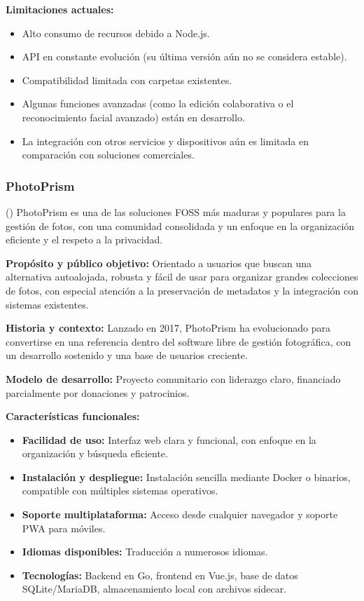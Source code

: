 \textbf{Limitaciones actuales:}
\begin{itemize}
    \item Alto consumo de recursos debido a Node.js.
    \item API en constante evolución (su última versión aún no se considera estable).
    \item Compatibilidad limitada con carpetas existentes.
    \item Algunas funciones avanzadas (como la edición colaborativa o el reconocimiento facial avanzado) están en desarrollo.
    \item La integración con otros servicios y dispositivos aún es limitada en comparación con soluciones comerciales.
\end{itemize}

\subsubsection{PhotoPrism}

(\cite{photoprism-documentation}) PhotoPrism es una de las soluciones FOSS más maduras y populares para la gestión de fotos, con una comunidad consolidada y un enfoque en la organización eficiente y el respeto a la privacidad.

\textbf{Propósito y público objetivo:} Orientado a usuarios que buscan una alternativa autoalojada, robusta y fácil de usar para organizar grandes colecciones de fotos, con especial atención a la preservación de metadatos y la integración con sistemas existentes.

\textbf{Historia y contexto:} Lanzado en 2017, PhotoPrism ha evolucionado para convertirse en una referencia dentro del software libre de gestión fotográfica, con un desarrollo sostenido y una base de usuarios creciente.

\textbf{Modelo de desarrollo:} Proyecto comunitario con liderazgo claro, financiado parcialmente por donaciones y patrocinios.

\textbf{Características funcionales:}
\begin{itemize}
    \item \textbf{Facilidad de uso:} Interfaz web clara y funcional, con enfoque en la organización y búsqueda eficiente.
    \item \textbf{Instalación y despliegue:} Instalación sencilla mediante Docker o binarios, compatible con múltiples sistemas operativos.
    \item \textbf{Soporte multiplataforma:} Acceso desde cualquier navegador y soporte PWA para móviles.
    \item \textbf{Idiomas disponibles:} Traducción a numerosos idiomas.
    \item \textbf{Tecnologías:} Backend en Go, frontend en Vue.js, base de datos SQLite/MariaDB, almacenamiento local con archivos sidecar.
\end{itemize}

